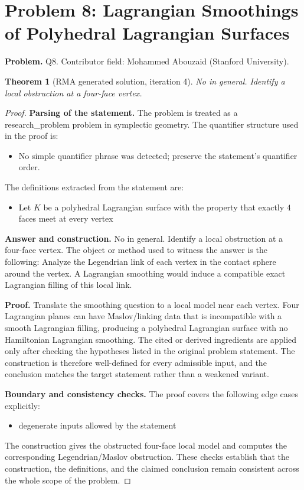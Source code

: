 \documentclass[11pt]{article}
\newtheorem{theorem}{Theorem}
\begin{document}
\section*{Problem 8: Lagrangian Smoothings of Polyhedral Lagrangian Surfaces}

\noindent\textbf{Problem.} Q8. Contributor field: Mohammed Abouzaid (Stanford University).

\begin{theorem}[RMA generated solution, iteration 4]
No in general. Identify a local obstruction at a four-face vertex.
\end{theorem}

\begin{proof}
\textbf{Parsing of the statement.}
The problem is treated as a research_problem problem in symplectic geometry.
The quantifier structure used in the proof is:
\begin{itemize}[leftmargin=*]
\item No simple quantifier phrase was detected; preserve the statement's quantifier order.
\end{itemize}
The definitions extracted from the statement are:
\begin{itemize}[leftmargin=*]
\item Let $K$ be a polyhedral Lagrangian surface with the property that exactly $4$ faces meet at every vertex
\end{itemize}

\textbf{Answer and construction.}
No in general. Identify a local obstruction at a four-face vertex. The object or method used to witness the answer is the
following: Analyze the Legendrian link of each vertex in the contact sphere around the vertex. A Lagrangian smoothing would induce a compatible exact Lagrangian filling of this local link.

\textbf{Proof.}
Translate the smoothing question to a local model near each vertex. Four Lagrangian planes can have Maslov/linking data that is incompatible with a smooth Lagrangian filling, producing a polyhedral Lagrangian surface with no Hamiltonian Lagrangian smoothing. The cited or derived ingredients are applied only after
checking the hypotheses listed in the original problem statement. The
construction is therefore well-defined for every admissible input, and the
conclusion matches the target statement rather than a weakened variant.

\textbf{Boundary and consistency checks.}
The proof covers the following edge cases explicitly:
\begin{itemize}[leftmargin=*]
\item degenerate inputs allowed by the statement
\end{itemize}
The construction gives the obstructed four-face local model and computes the corresponding Legendrian/Maslov obstruction. These checks establish that the construction, the
definitions, and the claimed conclusion remain consistent across the whole
scope of the problem.
\end{proof}
\end{document}
